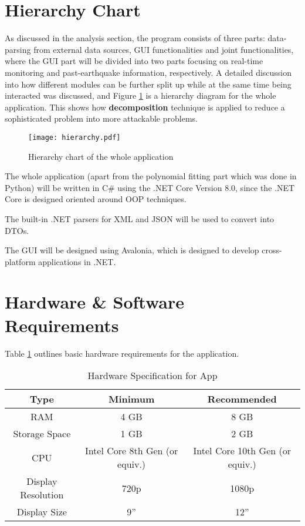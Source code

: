 
\section{Hierarchy Chart}
As discussed in the analysis section, the program consists of three parts: data-parsing from external data sources, GUI functionalities and joint functionalities, where the GUI part will be divided into two parts focusing on real-time monitoring and past-earthquake information, respectively. A detailed discussion into how different modules can be further split up while at the same time being interacted was discussed, and Figure \ref{fig:hierarchy} is a hierarchy diagram for the whole application. This shows how \textbf{decomposition} technique is applied to reduce a sophisticated problem into more attackable problems.

\begin{figure}[!ht]
    \centering
    \texttt{[image: hierarchy.pdf]}
    \caption{Hierarchy chart of the whole application}
    \label{fig:hierarchy}
\end{figure}

The whole application (apart from the polynomial fitting part which was done in Python) will be written in C\# using the .NET Core Version 8.0, since the .NET Core is designed oriented around OOP techniques.

The built-in .NET parsers for XML and JSON will be used to convert into DTOs.

The GUI will be designed using Avalonia, which is designed to develop cross-platform applications in .NET.

\section{Hardware \& Software Requirements}

Table \ref{tab:hardware-spec} outlines basic hardware requirements for the application.

\begin{table}[!ht]
    \centering

    \begin{tabular}{|c|c|c|}
        \hline
        Type               & Minimum                        & Recommended                     \\
        \hline
        RAM                & 4 GB                           & 8 GB                            \\
        Storage Space      & 1 GB                           & 2 GB                            \\
        CPU                & Intel Core 8th Gen (or equiv.) & Intel Core 10th Gen (or equiv.) \\
        Display Resolution & 720p                           & 1080p                           \\
        Display Size       & 9''                            & 12''                            \\
        \hline
    \end{tabular}
    \caption{Hardware Specification for App}
    \label{tab:hardware-spec}
\end{table}

